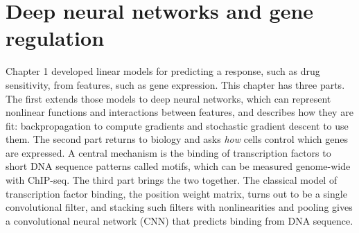 
\providecommand{\R}{\mathbb{R}}
\providecommand{\E}{\mathbb{E}}
\providecommand{\Normal}{\mathcal{N}}
\providecommand{\argmax}{\operatorname*{arg\,max}}
\providecommand{\argmin}{\operatorname*{arg\,min}}
\providecommand{\vy}{\mathbf{y}}
\providecommand{\vx}{\mathbf{x}}
\providecommand{\mX}{\mathbf{X}}
\providecommand{\mI}{\mathbf{I}}
\providecommand{\vb}{\boldsymbol{\beta}}
\providecommand{\veps}{\boldsymbol{\epsilon}}
\providecommand{\vp}{\mathbf{p}}
\providecommand{\vg}{\mathbf{g}}
\providecommand{\ind}{\mathbf{1}}
\providecommand{\mB}{\mathbf{B}}
\providecommand{\mA}{\mathbf{A}}
\providecommand{\mW}{\mathbf{W}}
\providecommand{\mP}{\mathbf{P}}
\providecommand{\mY}{\mathbf{Y}}
\providecommand{\mZ}{\mathbf{Z}}
\providecommand{\vh}{\mathbf{h}}
\providecommand{\vo}{\mathbf{o}}
\providecommand{\vu}{\mathbf{u}}
\providecommand{\vc}{\mathbf{c}}
\providecommand{\vm}{\mathbf{m}}
\providecommand{\vv}{\mathbf{v}}
\providecommand{\va}{\boldsymbol{\alpha}}
\providecommand{\vtheta}{\boldsymbol{\theta}}
\providecommand{\vdelta}{\boldsymbol{\delta}}
\providecommand{\Loss}{\mathcal{L}}
\providecommand{\vgamma}{\boldsymbol{\gamma}}

\providecommand{\chaptertoc}{}
\chapter{Deep neural networks and gene regulation}
\label{ch:cnn}
\chaptertoc

Chapter 1 developed linear models for predicting a response, such as drug sensitivity, from features, such as gene expression. This chapter has three parts. The first extends those models to deep neural networks, which can represent nonlinear functions and interactions between features, and describes how they are fit: backpropagation to compute gradients and stochastic gradient descent to use them. The second part returns to biology and asks \emph{how} cells control which genes are expressed. A central mechanism is the binding of transcription factors to short DNA sequence patterns called motifs, which can be measured genome-wide with ChIP-seq. The third part brings the two together. The classical model of transcription factor binding, the position weight matrix, turns out to be a single convolutional filter, and stacking such filters with nonlinearities and pooling gives a convolutional neural network (CNN) that predicts binding from DNA sequence.

